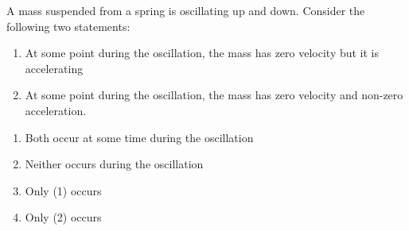 \begin{example}
  A mass suspended from a spring is oscillating up and down. Consider the
  following two statements:
  \begin{enumerate}[nosep]
  \item At some point during the oscillation, the mass has zero velocity but
    it is accelerating
  \item At some point during the oscillation, the mass has zero velocity and
    non-zero acceleration.
  \end{enumerate}
  \begin{enumerate}[nosep]
  \item Both occur at some time during the oscillation
  \item Neither occurs during the oscillation
  \item Only (1) occurs
  \item Only (2) occurs
  \end{enumerate}
\end{example}




